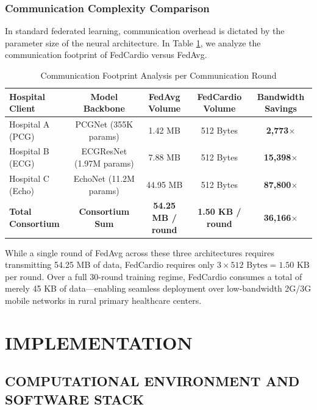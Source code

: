 \documentclass[12pt,a4paper]{amritareport}
\begin{document}
\subsection{Communication Complexity Comparison}
In standard federated learning, communication overhead is dictated by the parameter size of the neural architecture. In Table \ref{tab:comm_complexity}, we analyze the communication footprint of FedCardio versus FedAvg.

\begin{table}[htbp]
	\centering
	\caption{Communication Footprint Analysis per Communication Round}
	\label{tab:comm_complexity}
	\begin{tabular}{|l|c|c|c|c|}
		\hline
		\textbf{Hospital Client} & \textbf{Model Backbone} & \textbf{FedAvg Volume} & \textbf{FedCardio Volume} & \textbf{Bandwidth Savings} \\
		\hline
		Hospital A (PCG) & PCGNet (355K params) & 1.42 MB & 512 Bytes & \textbf{2,773$\times$} \\
		Hospital B (ECG) & ECGResNet (1.97M params) & 7.88 MB & 512 Bytes & \textbf{15,398$\times$} \\
		Hospital C (Echo) & EchoNet (11.2M params) & 44.95 MB & 512 Bytes & \textbf{87,800$\times$} \\
		\hline
		\textbf{Total Consortium} & \textbf{Consortium Sum} & \textbf{54.25 MB / round} & \textbf{1.50 KB / round} & \textbf{36,166$\times$} \\
		\hline
	\end{tabular}
\end{table}

While a single round of FedAvg across these three architectures requires transmitting 54.25 MB of data, FedCardio requires only $3 \times 512\text{ Bytes} = 1.50\text{ KB}$ per round. Over a full 30-round training regime, FedCardio consumes a total of merely 45 KB of data—enabling seamless deployment over low-bandwidth 2G/3G mobile networks in rural primary healthcare centers.



\chapter{IMPLEMENTATION}

\section{COMPUTATIONAL ENVIRONMENT AND SOFTWARE STACK}
\end{document}
